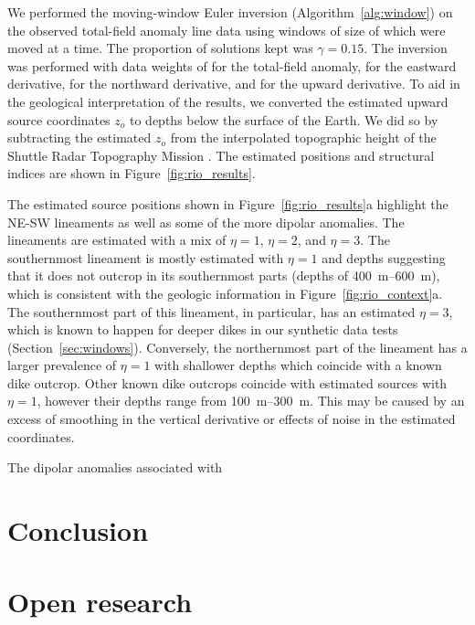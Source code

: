 We performed the moving-window Euler inversion (Algorithm~\ref{alg:window}) on the observed total-field anomaly line data using windows of size of \RioWindowSize{} which were moved \RioWindowStep{} at a time.
The proportion of solutions kept was $\gamma=0.15$.
The inversion was performed with data weights of \RioWeightsF{} for the total-field anomaly, \RioWeightsE{} for the eastward derivative, \RioWeightsN{} for the northward derivative, and \RioWeightsU{} for the upward derivative.
To aid in the geological interpretation of the results, we converted the estimated upward source coordinates $z_o$ to depths below the surface of the Earth.
We did so by subtracting the estimated $z_o$ from the interpolated topographic height of the Shuttle Radar Topography Mission \citep[SRTM;][]{SRTM}.
The estimated positions and structural indices are shown in Figure~\ref{fig:rio_results}.

The estimated source positions shown in Figure~\ref{fig:rio_results}a highlight the NE-SW lineaments as well as some of the more dipolar anomalies.
The lineaments are estimated with a mix of $\eta=1$, $\eta=2$, and $\eta=3$.
The southernmost lineament is mostly estimated with $\eta=1$ and depths suggesting that it does not outcrop in its southernmost parts (depths of \qtyrange{400}{600}{\m}), which is consistent with the geologic information in Figure~\ref{fig:rio_context}a.
The southernmost part of this lineament, in particular, has an estimated $\eta=3$, which is known to happen for deeper dikes in our synthetic data tests (Section~\ref{sec:windows}).
Conversely, the northernmost part of the lineament has a larger prevalence of $\eta=1$ with shallower depths which coincide with a known dike outcrop.
Other known dike outcrops coincide with estimated sources with $\eta=1$, however their depths range from \qtyrange{100}{300}{\m}.
This may be caused by an excess of smoothing in the vertical derivative or effects of noise in the estimated coordinates.

The dipolar anomalies associated with


\section{Conclusion}



\section{Open research}

